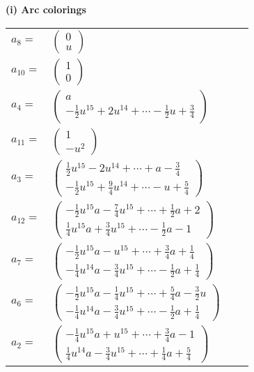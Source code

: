 \documentclass[1p]{elsarticle_modified}
\theoremstyle{definition}
\begin{document}
\flushleft \textbf{(i) Arc colorings}\\
\begin{tabular}{m{7pt} m{180pt} m{7pt} m{180pt} }
\flushright $a_{8}=$&$\begin{pmatrix}0\\u\end{pmatrix}$ \\
\flushright $a_{10}=$&$\begin{pmatrix}1\\0\end{pmatrix}$ \\
\flushright $a_{4}=$&$\begin{pmatrix}a\\-\frac{1}{2} u^{15}+2 u^{14}+\cdots-\frac{1}{2} u+\frac{3}{4}\end{pmatrix}$ \\
\flushright $a_{11}=$&$\begin{pmatrix}1\\- u^2\end{pmatrix}$ \\
\flushright $a_{3}=$&$\begin{pmatrix}\frac{1}{2} u^{15}-2 u^{14}+\cdots+a-\frac{3}{4}\\-\frac{1}{2} u^{15}+\frac{9}{4} u^{14}+\cdots- u+\frac{5}{4}\end{pmatrix}$ \\
\flushright $a_{12}=$&$\begin{pmatrix}-\frac{1}{2} u^{15} a-\frac{7}{4} u^{15}+\cdots+\frac{1}{2} a+2\\\frac{1}{4} u^{15} a+\frac{3}{4} u^{15}+\cdots-\frac{1}{2} a-1\end{pmatrix}$ \\
\flushright $a_{7}=$&$\begin{pmatrix}-\frac{1}{2} u^{15} a- u^{15}+\cdots+\frac{3}{4} a+\frac{1}{4}\\-\frac{1}{4} u^{14} a-\frac{3}{4} u^{15}+\cdots-\frac{1}{2} a+\frac{1}{4}\end{pmatrix}$ \\
\flushright $a_{6}=$&$\begin{pmatrix}-\frac{1}{2} u^{15} a-\frac{1}{4} u^{15}+\cdots+\frac{5}{4} a-\frac{3}{2} u\\-\frac{1}{4} u^{14} a-\frac{3}{4} u^{15}+\cdots-\frac{1}{2} a+\frac{1}{4}\end{pmatrix}$ \\
\flushright $a_{2}=$&$\begin{pmatrix}-\frac{1}{4} u^{15} a+u^{15}+\cdots+\frac{3}{4} a-1\\\frac{1}{4} u^{14} a-\frac{3}{4} u^{15}+\cdots+\frac{1}{4} a+\frac{5}{4}\end{pmatrix}$ \\

\end{tabular}
\end{document}
